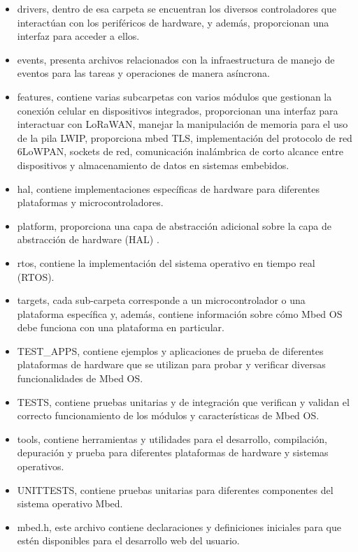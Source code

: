 \begin{itemize}

	\item drivers, dentro de esa carpeta se encuentran los diversos controladores que interactúan con los periféricos de hardware, y además, proporcionan una interfaz para acceder a ellos. 
	
	\item events, presenta archivos relacionados con la infraestructura de manejo de eventos para las tareas y operaciones de manera asíncrona.

	\item features, contiene varias subcarpetas con varios módulos que gestionan la conexión celular en dispositivos integrados, proporcionan una interfaz para interactuar con LoRaWAN, manejar la manipulación de memoria para el uso de la pila LWIP, proporciona mbed TLS, implementación del protocolo de red 6LoWPAN, sockets de red, comunicación inalámbrica de corto alcance entre dispositivos y almacenamiento de datos en sistemas embebidos. 
	
	\item hal, contiene implementaciones específicas de hardware para diferentes plataformas y microcontroladores.  
	
	\item platform, proporciona una capa de abstracción adicional sobre la capa de abstracción de hardware (HAL) .
	
	\item rtos, contiene la implementación del sistema operativo en tiempo real (RTOS).
	
	\item targets, cada sub-carpeta corresponde a un microcontrolador o una plataforma específica y, además, contiene información sobre cómo Mbed OS debe funciona con una plataforma en particular.
	
	\item TEST\_APPS, contiene ejemplos y aplicaciones de prueba de diferentes plataformas de hardware que se utilizan para probar y verificar diversas funcionalidades de Mbed OS.
	
	\item TESTS, contiene pruebas unitarias y de integración que verifican y validan el correcto funcionamiento de los módulos y características de Mbed OS.
	
	\item tools, contiene herramientas y utilidades para el desarrollo, compilación, depuración y prueba para diferentes plataformas de hardware y sistemas operativos.

	\item UNITTESTS, contiene pruebas unitarias para diferentes componentes del sistema operativo Mbed.

	\item mbed.h, este archivo contiene declaraciones y definiciones iniciales para que estén disponibles para el desarrollo web del usuario. 
	
\end{itemize}
